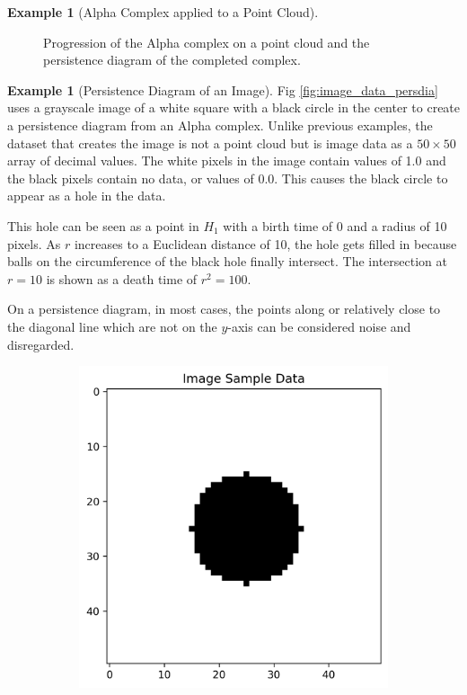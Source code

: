 \documentclass[ma]{uncgdissertationexp}
\theoremstyle{plain}
\theoremstyle{definition}
\newtheorem{example}[theorem]{Example}
\theoremstyle{remark}
\begin{document}
\begin{example}[Alpha Complex applied to a Point Cloud]
\begin{figure}[H]
    \caption{Progression of the Alpha complex on a point cloud and the persistence diagram of the completed complex.}
    \label{fig:point_cloud_alpha_complex}
\end{figure}
\end{example}

\newpage
\begin{example}[Persistence Diagram of an Image]
\par Fig \ref{fig:image_data_persdia} uses a grayscale image of a white square with a black circle in the center to create a persistence diagram from an Alpha complex. Unlike previous examples, the dataset that creates the image is not a point cloud but is image data as a $50\times50$ array of decimal values. The white pixels in the image contain values of 1.0 and the black pixels contain no data, or values of 0.0. This causes the black circle to appear as a hole in the data.
\par This hole can be seen as a point in $H_1$ with a birth time of 0 and a radius of 10 pixels. As $r$ increases to a Euclidean distance of 10, the hole gets filled in because balls on the circumference of the black hole finally intersect. The intersection at $r=10$ is shown as a death time of ${r}^2 = 100$.
\par On a persistence diagram, in most cases, the points along or relatively close to the diagonal line which are not on the $y$-axis can be considered noise and disregarded.
\begin{figure}[H]
    \centering
    \begin{subfigure}[b]{0.45\textwidth}
        \centering
        \includegraphics[width=\textwidth]{image_data_plot.png}

\end{subfigure}
\end{figure}
\end{example}
\end{document}
